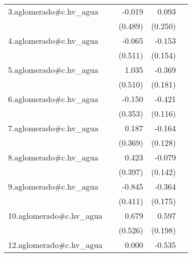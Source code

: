 {\begin{longtable}{l*{4}{D{.}{.}{-1}}}
\addlinespace
3.aglomerado#c.hv\_agua&                     &      -0.019         &       0.093         &                     \\
            &                     &     (0.489)         &     (0.250)         &                     \\
\addlinespace
4.aglomerado#c.hv\_agua&                     &      -0.065         &      -0.153         &                     \\
            &                     &     (0.511)         &     (0.154)         &                     \\
\addlinespace
5.aglomerado#c.hv\_agua&                     &       1.035\sym{*}  &      -0.369\sym{*}  &                     \\
            &                     &     (0.510)         &     (0.181)         &                     \\
\addlinespace
6.aglomerado#c.hv\_agua&                     &      -0.150         &      -0.421\sym{***}&                     \\
            &                     &     (0.353)         &     (0.116)         &                     \\
\addlinespace
7.aglomerado#c.hv\_agua&                     &       0.187         &      -0.164         &                     \\
            &                     &     (0.369)         &     (0.128)         &                     \\
\addlinespace
8.aglomerado#c.hv\_agua&                     &       0.423         &      -0.079         &                     \\
            &                     &     (0.397)         &     (0.142)         &                     \\
\addlinespace
9.aglomerado#c.hv\_agua&                     &      -0.845\sym{*}  &      -0.364\sym{*}  &                     \\
            &                     &     (0.411)         &     (0.175)         &                     \\
\addlinespace
10.aglomerado#c.hv\_agua&                     &       0.679         &       0.597\sym{**} &                     \\
            &                     &     (0.526)         &     (0.198)         &                     \\
\addlinespace
12.aglomerado#c.hv\_agua&                     &       0.000         &      -0.535\sym{**} &                     \\

\end{longtable}}

